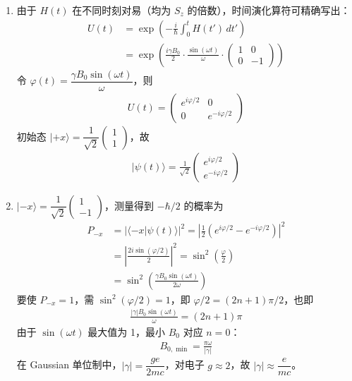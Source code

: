 \begin{enumerate}
{\begin{enumerate}
		\item 由于 $H(t)$ 在不同时刻对易（均为 $S_z$ 的倍数），时间演化算符可精确写出：
		\begin{align*}
			U(t)&=\exp\!\left(-\frac{i}{\hbar}\int_0^t H(t')\,dt'\right)\\
			&=\exp\!\left(\frac{i\gamma B_0}{2}\cdot\frac{\sin(\omega t)}{\omega}\cdot\begin{pmatrix}1&0\\0&-1\end{pmatrix}\right)
		\end{align*}
		令 $\varphi(t)=\dfrac{\gamma B_0\sin(\omega t)}{\omega}$，则
		\begin{align*}
			U(t)=\begin{pmatrix}e^{i\varphi/2}&0\\0&e^{-i\varphi/2}\end{pmatrix}
		\end{align*}
		初始态 $|+x\rangle=\dfrac{1}{\sqrt{2}}\begin{pmatrix}1\\1\end{pmatrix}$，故
		\begin{align*}
			|\psi(t)\rangle=\frac{1}{\sqrt{2}}\begin{pmatrix}e^{i\varphi/2}\\e^{-i\varphi/2}\end{pmatrix}
		\end{align*}

		\item $|-x\rangle=\dfrac{1}{\sqrt{2}}\begin{pmatrix}1\\-1\end{pmatrix}$，测量得到 $-\hbar/2$ 的概率为
		\begin{align*}
			P_{-x}&=|\langle -x|\psi(t)\rangle|^2=\left|\frac{1}{2}(e^{i\varphi/2}-e^{-i\varphi/2})\right|^2\\
			&=\left|\frac{2i\sin(\varphi/2)}{2}\right|^2=\sin^2\!\left(\frac{\varphi}{2}\right)\\
			&=\sin^2\!\left(\frac{\gamma B_0\sin(\omega t)}{2\omega}\right)
		\end{align*}
		要使 $P_{-x}=1$，需 $\sin^2(\varphi/2)=1$，即 $\varphi/2=(2n+1)\pi/2$，也即
		\begin{align*}
			\frac{|\gamma|B_0\sin(\omega t)}{\omega}=(2n+1)\pi
		\end{align*}
		由于 $\sin(\omega t)$ 最大值为 1，最小 $B_0$ 对应 $n=0$：
		\begin{align*}
			B_{0,\min}=\frac{\pi\omega}{|\gamma|}
		\end{align*}
		在 Gaussian 单位制中，$|\gamma|=\dfrac{ge}{2mc}$，对电子 $g\approx 2$，故 $|\gamma|\approx\dfrac{e}{mc}$。
	\end{enumerate}
	}


\end{enumerate}
